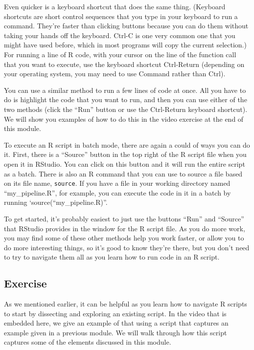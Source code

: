 \documentclass[]{tufte-book}
\begin{document}
Even quicker is a keyboard shortcut that does the same thing. (Keyboard
shortcuts are short control sequences that you type in your keyboard to run a
command. They're faster than clicking buttons because you can do them without
taking your hands off the keyboard. Ctrl-C is one very common one that you might
have used before, which in most programs will copy the current selection.) For
running a line of R code, with your cursor on the line of the function call that
you want to execute, use the keyboard shortcut Ctrl-Return (depending on your
operating system, you may need to use Command rather than Ctrl).

You can use a similar method to run a few lines of code at once. All you have to
do is highlight the code that you want to run, and then you can use either of
the two methods (click the ``Run'' button or use the Ctrl-Return keyboard shortcut).
We will show you examples of how to do this in the video exercise at the end
of this module.

To execute an R script in batch mode, there are again a could of ways you can do
it. First, there is a ``Source'' button in the top right of the R script file when
you open it in RStudio. You can click on this button and it will run the entire
script as a batch. There is also an R command that you can use to source a file
based on its file name, \texttt{source}. If you have a file in your working directory
named ``my\_pipeline.R'', for example, you can execute the code in it in a batch by
running `source(``my\_pipeline.R)''.

To get started, it's probably easiest to just use the buttons ``Run'' and ``Source''
that RStudio provides in the window for the R script file. As you do more work, you
may find some of these other methods help you work faster, or allow you to do
more interesting things, so it's good to know they're there, but you don't need
to try to navigate them all as you learn how to run code in an R script.

\subsection{Exercise}\label{exercise}

As we mentioned earlier, it can be helpful as you learn how to navigate R
scripts to start by dissecting and exploring an existing script. In the video
that is embedded here, we give an example of that using a script that captures
an example given in a previous module. We will walk through how this script
captures some of the elements discussed in this module.
\end{document}

